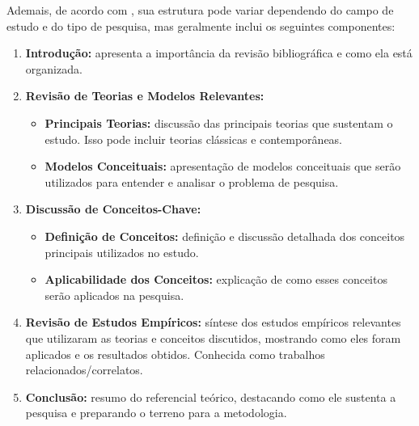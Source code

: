 Ademais, de acordo com , sua estrutura pode variar dependendo do campo de estudo e do tipo de pesquisa, mas geralmente inclui os seguintes componentes:
\begin{enumerate}[label=\roman*., nosep, leftmargin=2.5cm]
    \item \textbf{Introdução:} apresenta a importância da revisão bibliográfica e como ela está organizada.
    \item \textbf{Revisão de Teorias e Modelos Relevantes:}
        \begin{itemize}
            \item \textbf{Principais Teorias:} discussão das principais teorias que sustentam o estudo. Isso pode incluir teorias clássicas e contemporâneas.
            \item \textbf{Modelos Conceituais:} apresentação de modelos conceituais que serão utilizados para entender e analisar o problema de pesquisa.
        \end{itemize}
    \item \textbf{Discussão de Conceitos-Chave:}
        \begin{itemize}
            \item \textbf{Definição de Conceitos:} definição e discussão detalhada dos conceitos principais utilizados no estudo.
            \item \textbf{Aplicabilidade dos Conceitos:} explicação de como esses conceitos serão aplicados na pesquisa.
        \end{itemize}
    \item \textbf{Revisão de Estudos Empíricos:} síntese dos estudos empíricos relevantes que utilizaram as teorias e conceitos discutidos, mostrando como eles foram aplicados e os resultados obtidos. Conhecida como trabalhos relacionados/correlatos.
    \item \textbf{Conclusão:} resumo do referencial teórico, destacando como ele sustenta a pesquisa e preparando o terreno para a metodologia.
\end{enumerate}

\newpage

